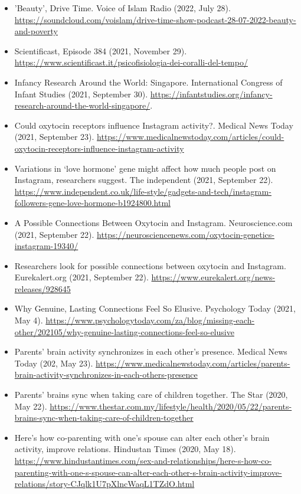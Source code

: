 \documentclass[10pt,a4paper]{altacv}
\begin{document}
\begin{fullwidth}
		\begin{itemize}
			\item 'Beauty', Drive Time. Voice of Islam Radio (2022, July 28). \url{https://soundcloud.com/voislam/drive-time-show-podcast-28-07-2022-beauty-and-poverty}
			\item Scientificast, Episode 384 (2021, November 29). \url{https://www.scientificast.it/psicofisiologia-dei-coralli-del-tempo/}
			\item Infancy Research Around the World: Singapore. International Congress of Infant Studies (2021, September 30). \url{https://infantstudies.org/infancy-research-around-the-world-singapore/}.
			\item Could oxytocin receptors influence Instagram activity?. Medical News Today (2021, September 23). \url{https://www.medicalnewstoday.com/articles/could-oxytocin-receptors-influence-instagram-activity}
			\item Variations in ‘love hormone’ gene might affect how much people post on Instagram, researchers suggest. The independent (2021, September 22). \url{https://www.independent.co.uk/life-style/gadgets-and-tech/instagram-followers-gene-love-hormone-b1924800.html}
			\item A Possible Connections Between Oxytocin and Instagram. Neuroscience.com (2021, September 22). \url{https://neurosciencenews.com/oxytocin-genetics-instagram-19340/}
			\item Researchers look for possible connections between oxytocin and Instagram. Eurekalert.org (2021, September 22). \url{https://www.eurekalert.org/news-releases/928645}
			\item Why Genuine, Lasting Connections Feel So Elusive. Psychology Today (2021, May 4). \url{https://www.psychologytoday.com/za/blog/missing-each-other/202105/why-genuine-lasting-connections-feel-so-elusive}
			\item Parents’ brain activity synchronizes in each other’s presence. Medical News Today (202, May 23). \url{https://www.medicalnewstoday.com/articles/parents-brain-activity-synchronizes-in-each-others-presence}
			\item Parents’ brains sync when taking care of children together. The Star (2020, May 22). \url{https://www.thestar.com.my/lifestyle/health/2020/05/22/parents-brains-sync-when-taking-care-of-children-together}
			\item Here’s how co-parenting with one’s spouse can alter each other’s brain activity, improve relations. Hindustan Times (2020, May 18). \url{https://www.hindustantimes.com/sex-and-relationships/here-s-how-co-parenting-with-one-s-spouse-can-alter-each-other-s-brain-activity-improve-relations/story-CJqlk1U7pXlncWaqL1TZdO.html}

\end{itemize}
\end{fullwidth}
\end{document}

